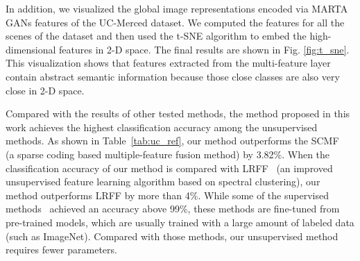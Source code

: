 \documentclass[journal]{IEEEtran}
\begin{document}
In addition, we visualized the global image representations encoded via MARTA GANs features of the UC-Merced dataset. We computed the features for all the scenes of the dataset and then used the t-SNE algorithm to embed the high-dimensional features in 2-D space. The final results are shown in Fig. \ref{fig:t_sne}. This visualization shows that features extracted from the multi-feature layer contain abstract semantic information because those close classes are also very close in 2-D space.





Compared with the results of other tested methods, the method proposed in this work achieves the highest classification accuracy among the unsupervised methods. As shown in Table~\ref{tab:uc_ref}, our method outperforms the SCMF~\cite{sheng2012high} (a sparse coding based multiple-feature fusion method) by 3.82\%. When the classification accuracy of our method is compared with  LRFF~\cite{hu2015unsupervised} (an improved unsupervised feature learning algorithm based on spectral clustering), our method  outperforms LRFF by more than 4\%. While some of the supervised methods~\cite{penatti2015deep, nogueira2017towards} achieved an accuracy above 99\%, these methods are fine-tuned from pre-trained models, which are usually trained with a large amount of labeled data (such as ImageNet). Compared with those methods, our unsupervised method requires fewer parameters.
\end{document}
